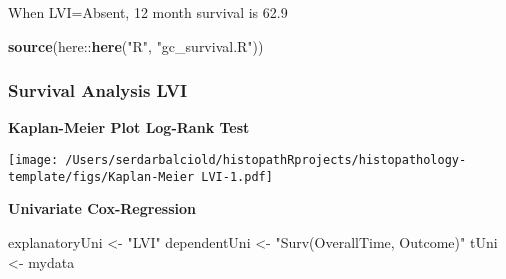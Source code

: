 \documentclass[
]{article}
\newenvironment{Shaded}{\begin{snugshade}}{\end{snugshade}}
\newcommand{\CommentTok}[1]{\textcolor[rgb]{0.54,0.53,0.53}{#1}}
\newcommand{\DataTypeTok}[1]{\textcolor[rgb]{0.00,0.34,0.68}{#1}}
\newcommand{\DecValTok}[1]{\textcolor[rgb]{0.69,0.50,0.00}{#1}}
\newcommand{\KeywordTok}[1]{\textcolor[rgb]{0.12,0.11,0.11}{\textbf{#1}}}
\newcommand{\NormalTok}[1]{\textcolor[rgb]{0.12,0.11,0.11}{#1}}
\newcommand{\OperatorTok}[1]{\textcolor[rgb]{0.12,0.11,0.11}{#1}}
\newcommand{\OtherTok}[1]{\textcolor[rgb]{0.00,0.43,0.16}{#1}}
\newcommand{\StringTok}[1]{\textcolor[rgb]{0.75,0.01,0.01}{#1}}
\begin{document}
\begin{landscape}
{{When LVI=Absent, 12 month survival is 62.9%

}
}

\begin{Shaded}
\begin{Highlighting}[]
\KeywordTok{source}\NormalTok{(here}\OperatorTok{::}\KeywordTok{here}\NormalTok{(}\StringTok{"R"}\NormalTok{, }\StringTok{"gc_survival.R"}\NormalTok{))}
\end{Highlighting}
\end{Shaded}

\hypertarget{survival-analysis-lvi}{%
\subsubsection{Survival Analysis LVI}\label{survival-analysis-lvi}}

\textbf{Kaplan-Meier Plot Log-Rank Test}

\begin{Shaded}
\end{Shaded}

\texttt{[image: /Users/serdarbalciold/histopathRprojects/histopathology-template/figs/Kaplan-Meier LVI-1.pdf]}

\textbf{Univariate Cox-Regression}

\begin{Shaded}
\begin{Highlighting}[]
\NormalTok{explanatoryUni <-}\StringTok{ "LVI"}
\NormalTok{dependentUni <-}\StringTok{ "Surv(OverallTime, Outcome)"}
\NormalTok{tUni <-}\StringTok{ }\NormalTok{mydata }\OperatorTok{%>%}\StringTok{ }\KeywordTok{finalfit}\NormalTok{(dependentUni, explanatoryUni, }\DataTypeTok{metrics =} \OtherTok{TRUE}\NormalTok{)}

}
\end{Highlighting}
\end{Shaded}
\end{landscape}
\end{document}
